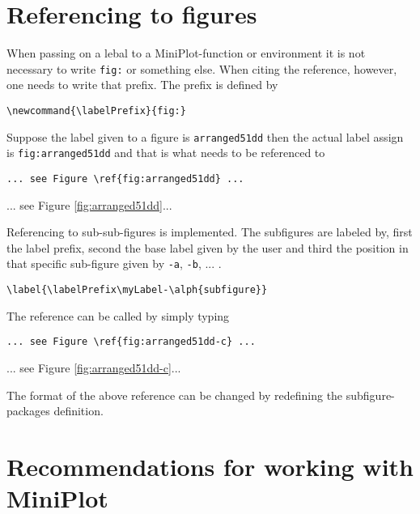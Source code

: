 \documentclass[12pt,a4paper]{article}
\newcommand{\comm}[1]{\texttt{#1}}
\begin{document}
\section{Referencing to figures}

When passing on a lebal to a MiniPlot-function or environment it is not
necessary to write \comm{fig:} or something else. When citing the reference,
however, one needs to write that prefix. The prefix is defined by

\begin{verbatim}
\newcommand{\labelPrefix}{fig:}
\end{verbatim}

Suppose the label given to a figure is \comm{arranged51dd} then the actual label
assign is \comm{fig:arranged51dd} and that is what needs to be referenced to

\begin{verbatim}
... see Figure \ref{fig:arranged51dd} ...
\end{verbatim}

... see Figure \ref{fig:arranged51dd}...\smallskip

Referencing to sub-sub-figures is implemented. The subfigures are labeled by, first the
label prefix, second the base label given by the user and third the position in that specific
sub-figure given by \comm{-a}, \comm{-b}, ... .

\begin{verbatim}
\label{\labelPrefix\myLabel-\alph{subfigure}}
\end{verbatim}

The reference can be called by simply typing

\begin{verbatim}
... see Figure \ref{fig:arranged51dd-c} ...
\end{verbatim}

... see Figure \ref{fig:arranged51dd-c}...\smallskip

The format of the above reference can be changed by redefining the subfigure-packages definition.









\section{Recommendations for working with MiniPlot}
\end{document}
